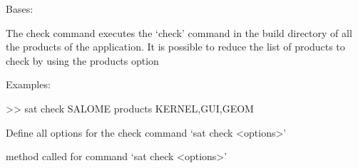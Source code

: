 \documentclass[a4paper,10pt,english]{sphinxmanual}
\begin{document}
\begin{fulllineitems}
\label{\detokenize{apidoc_commands/commands:commands.check.Command}}
Bases: 

The check command executes the ‘check’ command in the build directory of 
all the products of the application.
It is possible to reduce the list of products to check
by using the \textendash{}products option

\begin{DUlineblock}{0em}
\item[] Examples:
\item[] \textgreater{}\textgreater{} sat check SALOME \textendash{}products KERNEL,GUI,GEOM
\end{DUlineblock}

\begin{fulllineitems}
\label{\detokenize{apidoc_commands/commands:commands.check.Command.getParser}}
Define all options for the check command ‘sat check \textless{}options\textgreater{}’

\end{fulllineitems}


\begin{fulllineitems}
\label{\detokenize{apidoc_commands/commands:commands.check.Command.name}}
\end{fulllineitems}


\begin{fulllineitems}
\label{\detokenize{apidoc_commands/commands:commands.check.Command.run}}
method called for command ‘sat check \textless{}options\textgreater{}’

\end{fulllineitems}


\end{fulllineitems}

\end{document}
